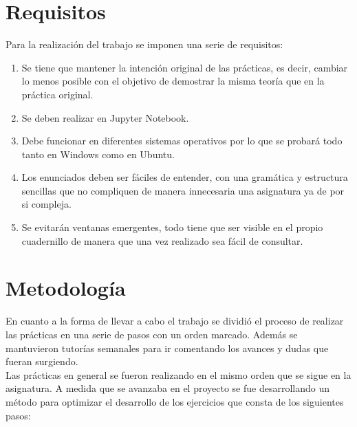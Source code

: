 \section{Requisitos}

Para la realización del trabajo se imponen una serie de requisitos:
\begin{enumerate}
    \item Se tiene que mantener la intención original de las prácticas, es decir, cambiar lo menos posible con el objetivo de demostrar la misma teoría que en la práctica original.
    \item Se deben realizar en Jupyter Notebook.
    \item Debe funcionar en diferentes sistemas operativos por lo que se probará todo tanto en Windows como en Ubuntu.
    \item Los enunciados deben ser fáciles de entender, con una gramática y estructura sencillas que no compliquen de manera innecesaria una asignatura ya de por si compleja.
    \item Se evitarán ventanas emergentes, todo tiene que ser visible en el propio cuadernillo de manera que una vez realizado sea fácil de consultar.
\end{enumerate}

\section{Metodología}

En cuanto a la forma de llevar a cabo el trabajo se dividió el proceso de realizar las prácticas en una serie de pasos con un orden marcado. Además se mantuvieron tutorías semanales para ir comentando los avances y dudas que fueran surgiendo.\\

Las prácticas en general se fueron realizando en el mismo orden que se sigue en la asignatura. A medida que se avanzaba en el proyecto se fue desarrollando un método para optimizar el desarrollo de los ejercicios que consta de los siguientes pasos:

